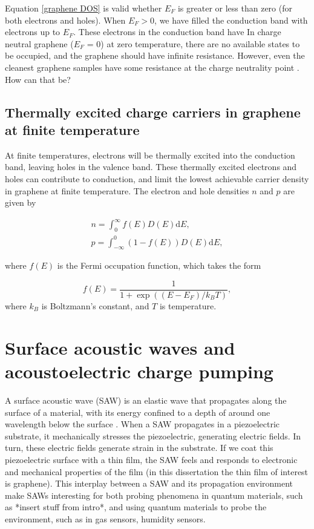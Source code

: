 \documentclass[double,12pt,1in]{beavtex}
\begin{document}
Equation \ref{graphene DOS} is valid whether $E_F$ is greater or less than zero (for both electrons and holes). When $E_F > 0$, we have filled the conduction band with electrons up to $E_F$. These electrons in the conduction band have  In charge neutral graphene ($E_F$ = 0) at zero temperature, there are no available states to be occupied, and the graphene should have infinite resistance. However, even the cleanest graphene samples have some resistance at the charge neutrality point \cite{xin_giant_2023}. How can that be?

\subsection{Thermally excited charge carriers in graphene at finite temperature}
At finite temperatures, electrons will be thermally excited into the conduction band, leaving holes in the valence band. These thermally excited electrons and holes can contribute to conduction, and limit the lowest achievable carrier density in graphene at finite temperature. The electron and hole densities $n$ and $p$ are given by

\begin{gather}
        n = \int_{0}^{\infty}f(E) D(E)\mathrm{d}E, \\
        p = \int_{-\infty}^{0}(1- f(E)) D(E)\mathrm{d}E,
\end{gather}

where $f(E)$ is the Fermi occupation function, which takes the form

\begin{equation}
    f(E) = \frac{1}{1+\exp((E-E_F)/k_B T)},
\end{equation}
where $k_B$ is Boltzmann's constant, and $T$ is temperature.

\section{Surface acoustic waves and acoustoelectric charge pumping}


A surface acoustic wave (SAW) is an elastic wave that propagates along the surface of a material, with its energy confined to a depth of around one wavelength below the surface \cite{rayleigh_waves_1885}. When a SAW propagates in a piezoelectric substrate, it mechanically stresses the piezoelectric, generating electric fields. In turn, these electric fields generate strain in the substrate. If we coat this piezoelectric surface with a thin film, the SAW feels and responds to electronic and mechanical properties of the film (in this dissertation the thin film of interest is graphene). This interplay between a SAW and its propagation environment make SAWs interesting for both probing phenomena in quantum materials, such as *insert stuff from intro*, and using quantum materials to probe the environment, such as in gas sensors, humidity sensors.
\end{document}

